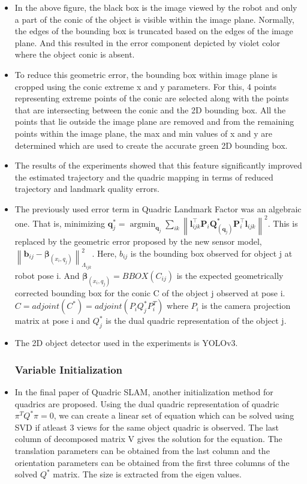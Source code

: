 \documentclass[report.tex]{subfiles}
\begin{document}
\begin{itemize}
    \item In the above figure, the black box is the image viewed by the robot and only a part of the conic of the object is visible within the image plane. Normally, the edges of the bounding box is truncated based on the edges of the image plane. And this resulted in the error component depicted by violet color where the object conic is absent.
    \item To reduce this geometric error, the bounding box within image plane is cropped using the conic extreme x and y parameters. For this, 4 points representing extreme points of the conic are selected along with the points that are intersecting between the conic and the 2D bounding box. All the points that lie outside the image plane are removed and from the remaining points within the image plane, the max and min values of x and y are determined which are used to create the accurate green 2D bounding box.
    \item The results of the experiments showed that this feature significantly improved the estimated trajectory and the quadric mapping in terms of reduced trajectory and landmark quality errors.
    \item The previously used error term in Quadric Landmark Factor was an algebraic one. That is, minimizing $\mathbf{q}_{j}^{*}=\operatorname{argmin}_{\mathbf{q}_{j}} \sum_{i k}\left\|\mathbf{l}_{i j k}^{\top} \mathbf{P}_{i} \mathbf{Q}_{\left(\mathbf{q}_{j}\right)}^{*} \mathbf{P}_{i}^{\top} \mathbf{l}_{i j k}\right\|^{2}$. This is replaced by the geometric error proposed by the new sensor model, $\left\|\mathbf{b}_{i j} - \boldsymbol{\beta} _{(x_i,q_j)}\right\|^{2}_{\Lambda_{i j k}}$. Here, ${b}_{i j}$ is the bounding box observed for object j at robot pose i. And $\boldsymbol{\beta} _{(x_i,q_j)} = BBOX(C_{ij})$ is the expected geometrically corrected bounding box for the conic C of the object j observed at pose i. $C = adjoint(C^*) = adjoint(P_i Q^{*}_j P_i^{T})$ where $P_i$ is the camera projection matrix at pose i and $Q^{*}_j$ is the dual quadric representation of the object j.
    \item The 2D object detector used in the experiments is YOLOv3.
    
\subsubsection{Variable Initialization}

\item In the final paper of Quadric SLAM\cite{quadric2}, another initialization method for quadrics are proposed. Using the dual quadric representation of quadric $\pi^{T}Q^{*}\pi = 0$, we can create a linear set of equation which can be solved using SVD if atleast 3 views for the same object quadric is observed. The last column of decomposed matrix V gives the solution for the equation. The translation parameters can be obtained from the last column and the orientation parameters can be obtained from the first three columns of the solved $Q^{*}$ matrix. The size is extracted from the eigen values.\cite{quadric2}
\end{itemize}
\end{document}
